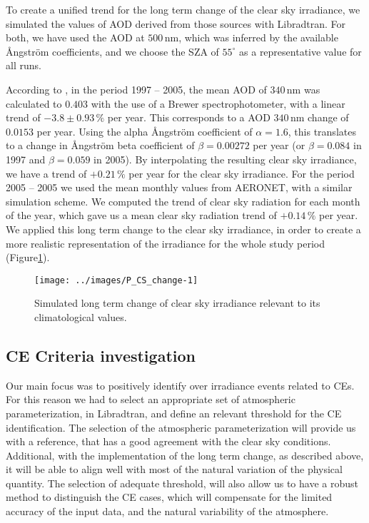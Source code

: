 \documentclass[preprint, 3p,
authoryear]{elsarticle} %
\begin{document}
To create a unified trend for the long term change of the clear sky
irradiance, we simulated the values of AOD derived from those sources
with Libradtran. For both, we have used the AOD at \(500\,\text{nm}\),
which was inferred by the available Ångström coefficients, and we choose
the SZA of \(55^\circ\) as a representative value for all runs.

According to \citet{Kazadzis2007}, in the period 1997 -- 2005, the mean
AOD of \(340\,\text{nm}\) was calculated to \(0.403\) with the use of a
Brewer spectrophotometer, with a linear trend of \(-3.8±0.93\,\%\) per
year. This corresponds to a AOD \(340\,\text{nm}\) change of \(0.0153\)
per year. Using the alpha Ångström coefficient of \(\alpha = 1.6\), this
translates to a change in Ångström beta coefficient of \(\beta=0.00272\)
per year (or \(\beta=0.084\) in 1997 and \(\beta=0.059\) in 2005). By
interpolating the resulting clear sky irradiance, we have a trend of
\(+0.21\,\%\) per year for the clear sky irradiance. For the period 2005
-- 2005 we used the mean monthly values from AERONET, with a similar
simulation scheme. We computed the trend of clear sky radiation for each
month of the year, which gave us a mean clear sky radiation trend of
\(+0.14\,\%\) per year. We applied this long term change to the clear
sky irradiance, in order to create a more realistic representation of
the irradiance for the whole study period
(Figure\nobreakspace{}\ref{fig:CS-change}).

\begin{figure}

{\centering \texttt{[image: ../images/P\_CS\_change-1]} 

}

\caption{Simulated long term change of clear sky irradiance relevant to its climatological values.}\label{fig:CS-change}
\end{figure}

\hypertarget{ce-criteria-investigation}{%
\subsection{CE Criteria investigation}\label{ce-criteria-investigation}}

Our main focus was to positively identify over irradiance events related
to CEs. For this reason we had to select an appropriate set of
atmospheric parameterization, in Libradtran, and define an relevant
threshold for the CE identification. The selection of the atmospheric
parameterization will provide us with a reference, that has a good
agreement with the clear sky conditions. Additional, with the
implementation of the long term change, as described above, it will be
able to align well with most of the natural variation of the physical
quantity. The selection of adequate threshold, will also allow us to
have a robust method to distinguish the CE cases, which will compensate
for the limited accuracy of the input data, and the natural variability
of the atmosphere.
\end{document}
